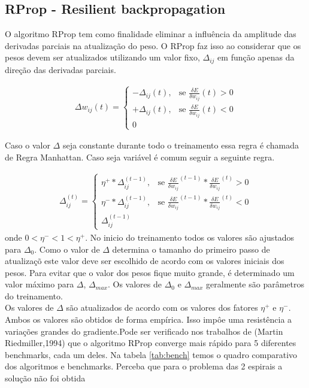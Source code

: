 \documentclass[
	article,			%
	11pt,				%
	oneside,			%
	a4paper,			%
	english,			%
	brazil,				%
	sumario=tradicional
	]{abntex2}
\begin{document}
\subsection{RProp - Resilient backpropagation}
O algoritmo RProp tem como finalidade eliminar a influência da amplitude das
derivadas parciais na atualização do peso. O RProp faz isso ao considerar que os
pesos devem ser atualizados utilizando um valor fixo, $\Delta_{ij}$ em função
apenas da direção das derivadas parciais.

\begin{align}
\Delta w_{ij}(t) = 
\begin{cases} 
		-\Delta_{ij}(t), & \mbox{se } \frac{\delta E}{\delta w_{ij}}(t)>0 \\ 
		+\Delta_{ij}(t), & \mbox{se } \frac{\delta E}{\delta w_{ij}}(t)<0 \\
		0
\end{cases}
\end{align}

Caso o valor $\Delta$ seja constante durante todo o treinamento essa regra é
chamada de Regra Manhattan.
Caso seja variável é comum seguir a seguinte regra.

\begin{align}
\Delta^{(t)}_{ij} = 
\begin{cases} 
		\eta^+*\Delta_{ij}^{(t-1)}, & \mbox{se } 
		\frac{\delta E}{\delta w_{ij}}^{(t-1)}*
		\frac{\delta E}{\delta w_{ij}}^{(t)} >0
		\\
		\eta^-*\Delta_{ij}^{(t-1)}, & \mbox{se } 
		\frac{\delta E}{\delta w_{ij}}^{(t-1)}*
		\frac{\delta E}{\delta w_{ij}}^{(t)} <0 \\
		\Delta_{ij}^{(t-1)}
\end{cases}
\end{align}
onde
$0<\eta^-<1<\eta^+$.
No inicio do treinamento todos os valores são ajustados para $\Delta_0$. Como o
valor de $\Delta$ determina o tamanho do primeiro passo de atualizaçõ este
valor deve ser escolhido de acordo com os valores iniciais dos pesos.
Para evitar que o valor dos pesos fique muito grande, é determinado um valor
máximo para $\Delta$, $\Delta_{max}$. Os valores de $\Delta_0$ e $\Delta_{max}$
geralmente são parâmetros do treinamento.
\newline
\\
    Os valores de $\Delta$ são atualizados de acordo com os valores dos
fatores $\eta^+$ e $\eta^-$. Ambos os valores são obtidos de forma empírica. Isso impôe
uma resistência a variações grandes do gradiente.Pode ser verificado
nos trabalhos de (Martin Riedmiller,1994) que o algoritmo RProp converge mais
rápido para 5 diferentes benchmarks, cada um deles. Na tabela \ref{tab:bench}
temos o quadro comparativo dos algoritmos e benchmarks. Perceba que para o
problema das 2 espirais a solução não foi obtida
\end{document}
